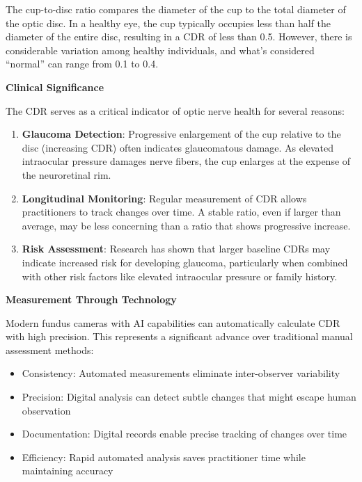 \documentclass[
  Letterpaper,
]{scrbook}
\providecommand{\tightlist}{%
  \setlength{\itemsep}{0pt}\setlength{\parskip}{0pt}}\usepackage{longtable,booktabs,array}
\begin{document}
The cup-to-disc ratio compares the diameter of the cup to the total
diameter of the optic disc. In a healthy eye, the cup typically occupies
less than half the diameter of the entire disc, resulting in a CDR of
less than 0.5. However, there is considerable variation among healthy
individuals, and what's considered ``normal'' can range from 0.1 to 0.4.

\textbf{Clinical Significance}

The CDR serves as a critical indicator of optic nerve health for several
reasons:

\begin{enumerate}
\def\labelenumi{\arabic{enumi}.}
\tightlist
\item
  \textbf{Glaucoma Detection}: Progressive enlargement of the cup
  relative to the disc (increasing CDR) often indicates glaucomatous
  damage. As elevated intraocular pressure damages nerve fibers, the cup
  enlarges at the expense of the neuroretinal rim.
\item
  \textbf{Longitudinal Monitoring}: Regular measurement of CDR allows
  practitioners to track changes over time. A stable ratio, even if
  larger than average, may be less concerning than a ratio that shows
  progressive increase.
\item
  \textbf{Risk Assessment}: Research has shown that larger baseline CDRs
  may indicate increased risk for developing glaucoma, particularly when
  combined with other risk factors like elevated intraocular pressure or
  family history.
\end{enumerate}

\textbf{Measurement Through Technology}

Modern fundus cameras with AI capabilities can automatically calculate
CDR with high precision. This represents a significant advance over
traditional manual assessment methods:

\begin{itemize}
\tightlist
\item
  Consistency: Automated measurements eliminate inter-observer
  variability
\item
  Precision: Digital analysis can detect subtle changes that might
  escape human observation
\item
  Documentation: Digital records enable precise tracking of changes over
  time
\item
  Efficiency: Rapid automated analysis saves practitioner time while
  maintaining accuracy
\end{itemize}
\end{document}
